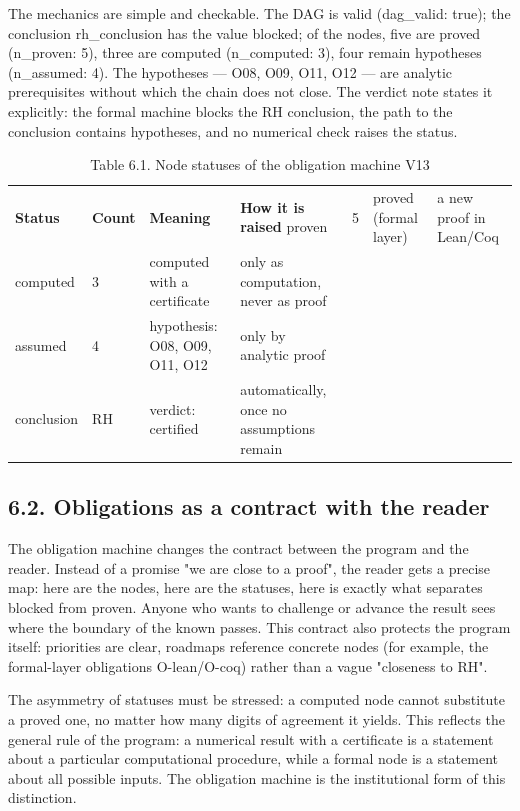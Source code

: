 \documentclass[11pt,a4paper]{article}
\begin{document}
The mechanics are simple and checkable. The DAG is valid (dag\_valid: true); the conclusion rh\_conclusion has the value blocked; of the nodes, five are proved (n\_proven: 5), three are computed (n\_computed: 3), four remain hypotheses (n\_assumed: 4). The hypotheses — O08, O09, O11, O12 — are analytic prerequisites without which the chain does not close. The verdict note states it explicitly: the formal machine blocks the RH conclusion, the path to the conclusion contains hypotheses, and no numerical check raises the status.

\begin{table}[htbp]\centering\small
\caption{Table 6.1. Node statuses of the obligation machine V13}
\begin{tabular}{p{} p{} p{} p{}}
\toprule
\textbf{Status} & \textbf{Count} & \textbf{Meaning} & \textbf{How it is raised}
\midrule
proven & 5 & proved (formal layer) & a new proof in Lean/Coq \\
computed & 3 & computed with a certificate & only as computation, never as proof \\
assumed & 4 & hypothesis: O08, O09, O11, O12 & only by analytic proof \\
conclusion & RH & verdict: certified & automatically, once no assumptions remain \\
\bottomrule
\end{tabular}
\end{table}

\subsection{6.2. Obligations as a contract with the reader}

The obligation machine changes the contract between the program and the reader. Instead of a promise "we are close to a proof", the reader gets a precise map: here are the nodes, here are the statuses, here is exactly what separates blocked from proven. Anyone who wants to challenge or advance the result sees where the boundary of the known passes. This contract also protects the program itself: priorities are clear, roadmaps reference concrete nodes (for example, the formal-layer obligations O-lean/O-coq) rather than a vague "closeness to RH".

The asymmetry of statuses must be stressed: a computed node cannot substitute a proved one, no matter how many digits of agreement it yields. This reflects the general rule of the program: a numerical result with a certificate is a statement about a particular computational procedure, while a formal node is a statement about all possible inputs. The obligation machine is the institutional form of this distinction.
\end{document}
